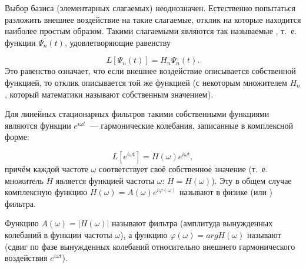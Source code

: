 Выбор базиса (элементарных слагаемых) неоднозначен. Естественно попытаться разложить внешнее воздействие на такие
слагаемые, отклик на которые находится наиболее простым образом. Такими слагаемыми являются так называемые
, т.~е. функции $\Psi_n(t)$, удовлетворяющие равенству

\begin{equation*}
	L[\Psi_n(t)]=H_n\Psi_n(t).
\end{equation*}
Это равенство означает, что если внешнее воздействие описывается собственной функцией, то отклик описывается той же
функцией (с некоторым множителем $H_n$, который математики называют собственным значением).

Для линейных стационарных фильтров такими собственными функциями являются функции $e^{i\omega t}$~--- гармонические
колебания, записанные в комплексной форме:

\begin{equation*}
	L\left[e^{i\omega t}\right]=H(\omega)e^{i\omega t},
\end{equation*}
причём каждой частоте $\omega$ соответствует своё собственное значение (т.~е. множитель $H$ является функцией частоты
$\omega$: $H=H(\omega)$). Эту в общем случае комплексную функцию $H(\omega)=A(\omega)e^{i\varphi(\omega)}$ называют в физике
 (или ) фильтра.

Функцию $A(\omega)=|H(\omega)|$ называют  фильтра (амплитуда вынужденных колебаний в
функции частоты $\omega$), а функцию $\varphi(\omega)= arg H(\omega)$ называют  (сдвиг по фазе
вынужденных колебаний относительно внешнего гармонического воздействия $e^{i\omega t}$).



%

